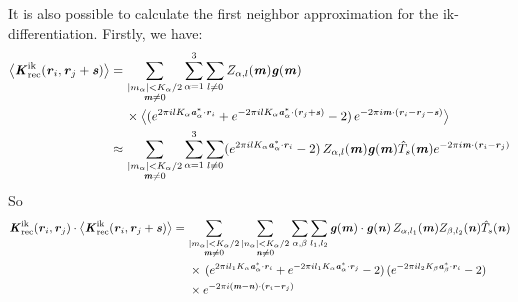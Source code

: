 \documentclass[aps,pre,preprint,unsortedaddress]{revtex4}
\renewcommand{\v}[1]{\textbf{\textit{#1}}}
\begin{document}
It is also possible to calculate the first neighbor approximation for the
ik-differentiation. Firstly, we have:
\begin{align}\nonumber
  \big\langle
  \v K^{\textrm{ik}}_{\textrm{rec}}(\v r_i, \v r_j+\v s)
  \big\rangle
  = \,&
  \sum_{
    \begin{subarray}{c}
      \vert m_{\alpha}\vert < K_\alpha/2\\
      \v m\neq 0
    \end{subarray}}
  \sum_{\alpha=1}^3\sum_{l\neq 0}
  Z_{\alpha,l}(\v m)
  \v g(\v m) \\ \nonumber
  \,&
  \times
  \big\langle
  (
  e^{2\pi i l K_\alpha\v a^\ast_\alpha\cdot \v r_i} +
  e^{-2\pi i l K_\alpha\v a^\ast_\alpha\cdot (\v r_j + \v s)}
  - 2
  )\,
  e^{-2\pi i\v m\cdot(\v r_i-\v r_j -\v s)}
  \big\rangle \\
  \approx\,&
  \sum_{
    \begin{subarray}{c}
      \vert m_{\alpha}\vert < K_\alpha/2\\
      \v m\neq 0
    \end{subarray}}
  \sum_{\alpha=1}^3\sum_{l\neq 0}
  (
  e^{2\pi i l K_\alpha\v a^\ast_\alpha\cdot \v r_i} 
  - 2
  )\,
  Z_{\alpha,l}(\v m)
  \v g(\v m)
  \hat T_s(\v m)
  e^{-2\pi i\v m\cdot(\v r_i-\v r_j)}  
\end{align}
So
\begin{align}\nonumber
  \v K^{\textrm{ik}}_{\textrm{rec}}(\v r_i,\v r_j)\cdot
  \big\langle
  \v K^{\textrm{ik}}_{\textrm{rec}}(\v r_i, \v r_j+\v s)
  \big\rangle
  =\,&
  \sum_{
    \begin{subarray}{c}
      \vert m_{\alpha}\vert < K_\alpha/2\\
      \v m\neq 0
    \end{subarray}}
  \sum_{
    \begin{subarray}{c}
      \vert n_{\alpha}\vert < K_\alpha/2\\
      \v n\neq 0
    \end{subarray}}
  \sum_{\alpha,\beta}
  \sum_{l_1,l_2}
  \v g(\v m)\cdot\v g(\v n)\,
  Z_{\alpha,l_1}(\v m)Z_{\beta,l_2}(\v n)\hat T_s(\v n)
  \\\nonumber
  &\,
  \times
  \,(
  e^{2\pi i l_1 K_\alpha\v a^\ast_\alpha\cdot \v r_i} +
  e^{-2\pi i l_1 K_\alpha\v a^\ast_\alpha\cdot \v r_j}
  - 2
  )
  \,(
  e^{-2\pi i l_2 K_\beta\v a^\ast_\beta\cdot \v r_i}
  - 2
  )\\
  &\,
  \times
  e^{-2\pi i(\v m-\v n)\cdot(\v r_i-\v r_j)}
\end{align}
\end{document}
